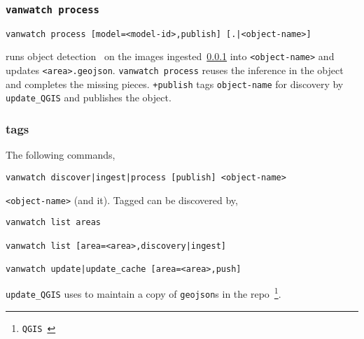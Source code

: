 \subsubsection{\texttt{vanwatch process}}\label{vanwatch_process}

\begin{verbatim}
vanwatch process [model=<model-id>,publish] [.|<object-name>]
\end{verbatim}
%
runs object detection~\cite{ultralytics} on the images ingested~\ref{vanwatch_process} into \texttt{<object-name>} and updates \texttt{<area>.geojson}. \texttt{vanwatch process} reuses the inference in the object and completes the missing pieces. \texttt{+publish} tags \texttt{object-name} for discovery by \texttt{update\_QGIS} and publishes the object.

\subsubsection{tags}\label{vanwatch_tags}

The following commands,

\begin{verbatim}
vanwatch discover|ingest|process [publish] <object-name>
\end{verbatim}
%
 \texttt{<object-name>} (and  it). Tagged  can be discovered by,
%
\begin{verbatim}
vanwatch list areas

vanwatch list [area=<area>,discovery|ingest]

vanwatch update|update_cache [area=<area>,push]
\end{verbatim}
%
\texttt{update\_QGIS} uses  to maintain a copy of \texttt{geojson}s in the repo~\footnote{\texttt{QGIS}~\cite{vanwatch}}.